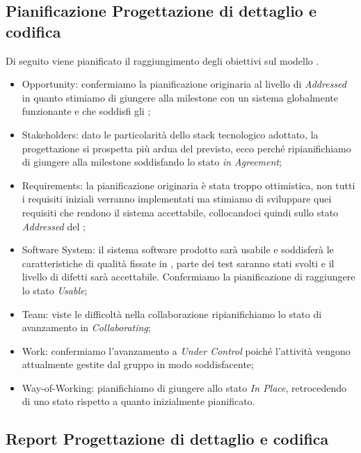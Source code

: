 \subsection{Pianificazione Progettazione di dettaglio e codifica}
Di seguito viene pianificato il raggiungimento degli obiettivi sul modello . 

\begin{itemize}
	\item Opportunity: confermiamo la pianificazione originaria al livello di \emph{Addressed} in quanto stimiamo di giungere alla milestone con un sistema globalmente funzionante e che soddisfi gli ;
	\item Stakeholders: dato le particolarità dello stack tecnologico adottato, la progettazione si prospetta più ardua del previsto, ecco perché ripianifichiamo di giungere alla milestone soddisfando lo stato \emph{in Agreement};
	\item Requirements: la pianificazione originaria è stata troppo ottimistica, non tutti i requisiti iniziali verranno implementati ma stimiamo di sviluppare quei requisiti che rendono il sistema accettabile, collocandoci quindi sullo stato \emph{Addressed} del ;
	\item Software System: il sistema software prodotto sarà usabile e soddisferà le caratteristiche di qualità fissate in \PianoDiQualifica{}, parte dei test saranno stati svolti e il livello di difetti sarà accettabile. Confermiamo la pianificazione di raggiungere lo stato \emph{Usable};
	\item Team: viste le difficoltà nella collaborazione ripianifichiamo lo stato di avanzamento in \emph{Collaborating};
	\item Work: confermiamo l'avanzamento a \emph{Under Control} poiché l'attività vengono attualmente gestite dal gruppo in modo soddisfacente;
	\item Way-of-Working: pianifichiamo di giungere allo stato \emph{In Place}, retrocedendo di uno stato rispetto a quanto inizialmente pianificato.
\end{itemize}


\subsection{Report Progettazione di dettaglio e codifica}
	
	\newpage